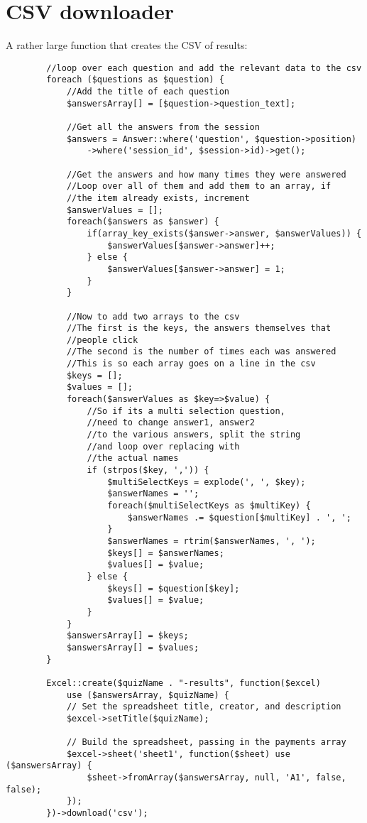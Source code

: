 \section{CSV downloader}
A rather large function that creates the CSV of results:
\begin{verbatim}
        //loop over each question and add the relevant data to the csv
        foreach ($questions as $question) {
            //Add the title of each question
            $answersArray[] = [$question->question_text];
            
            //Get all the answers from the session
            $answers = Answer::where('question', $question->position)
                ->where('session_id', $session->id)->get();

            //Get the answers and how many times they were answered
            //Loop over all of them and add them to an array, if 
            //the item already exists, increment
            $answerValues = [];
            foreach($answers as $answer) {
                if(array_key_exists($answer->answer, $answerValues)) {
                    $answerValues[$answer->answer]++;
                } else {
                    $answerValues[$answer->answer] = 1;
                }
            }
            
            //Now to add two arrays to the csv
            //The first is the keys, the answers themselves that 
            //people click
            //The second is the number of times each was answered
            //This is so each array goes on a line in the csv
            $keys = [];
            $values = [];
            foreach($answerValues as $key=>$value) {
                //So if its a multi selection question, 
                //need to change answer1, answer2
                //to the various answers, split the string 
                //and loop over replacing with
                //the actual names
                if (strpos($key, ',')) {
                    $multiSelectKeys = explode(', ', $key);
                    $answerNames = '';
                    foreach($multiSelectKeys as $multiKey) {
                        $answerNames .= $question[$multiKey] . ', ';
                    }
                    $answerNames = rtrim($answerNames, ', ');
                    $keys[] = $answerNames;
                    $values[] = $value;
                } else {
                    $keys[] = $question[$key];
                    $values[] = $value;
                }
            }
            $answersArray[] = $keys;
            $answersArray[] = $values;
        }

        Excel::create($quizName . "-results", function($excel) 
        	use ($answersArray, $quizName) {
            // Set the spreadsheet title, creator, and description
            $excel->setTitle($quizName);

            // Build the spreadsheet, passing in the payments array
            $excel->sheet('sheet1', function($sheet) use ($answersArray) {
                $sheet->fromArray($answersArray, null, 'A1', false, false);
            });
        })->download('csv');
\end{verbatim}
\newpage